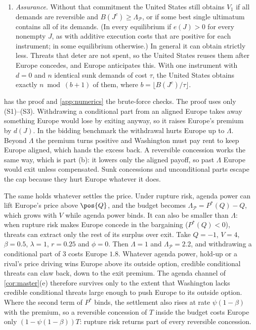 \begin{proposition}
\begin{enumerate}[label=(\alph*)]
\begin{enumerate}[label=(\roman*)]
  \end{enumerate}
\item \emph{Assurance.} Without that commitment the United States still obtains $V_1$ if all demands are reversible and $B(J^c)\ge\Lambda_{\mathcal P}$, or if some best single ultimatum contains all of its demands. (In every equilibrium if $e(J)>0$ for every nonempty $J$, as with additive execution costs that are positive for each instrument; in some equilibrium otherwise.) In general it can obtain strictly less. Threats that deter are not spent, so the United States reuses them after Europe concedes, and Europe anticipates this. With one instrument with $d=0$ and $n$ identical sunk demands of cost $\tau$, the United States obtains exactly $n \bmod (b+1)$ of them, where $b=\lfloor B(J^c)/\tau\rfloor$.
\end{enumerate}
\end{proposition}

 has the proof and \cref{app:numerics} the brute-force checks. The proof uses only (S1)--(S3). Withdrawing a conditional part from an aligned Europe takes away something Europe would lose by exiting anyway, so it raises Europe's premium by $d(J)$. In the bidding benchmark the withdrawal hurts Europe up to $\Lambda$. Beyond $\Lambda$ the premium turns positive and Washington must pay rent to keep Europe aligned, which hands the excess back. A reversible concession works the same way, which is part (b): it lowers only the aligned payoff, so past $\Lambda$ Europe would exit unless compensated. Sunk concessions and unconditional parts escape the cap because they hurt Europe whatever it does.

The same holds whatever settles the price. Under rupture risk, agenda power can lift Europe's price above $\pos{Q}$, and the budget becomes $\Lambda_{\mathcal P}=P^*(Q)-Q$, which grows with $V$ while agenda power binds. It can also be smaller than $\Lambda$: when rupture risk makes Europe concede in the bargaining ($P^*(Q)<0$), threats can extract only the rest of its surplus over exit. Take $Q=-1$, $V=4$, $\beta=0.5$, $\lambda=1$, $r=0.25$ and $\phi=0$. Then $\Lambda=1$ and $\Lambda_{\mathcal P}=2.2$, and withdrawing a conditional part of $3$ costs Europe $1.8$. Whatever agenda power, hold-up or a rival's price driving wins Europe above its outside option, credible conditional threats can claw back, down to the exit premium. The agenda channel of \cref{cor:master}(e) therefore survives only to the extent that Washington lacks credible conditional threats large enough to push Europe to its outside option. Where the second term of $P^*$ binds, the settlement also rises at rate $\psi(1-\beta)$ with the premium, so a reversible concession of $T$ inside the budget costs Europe only $(1-\psi(1-\beta))T$: rupture risk returns part of every reversible concession.

